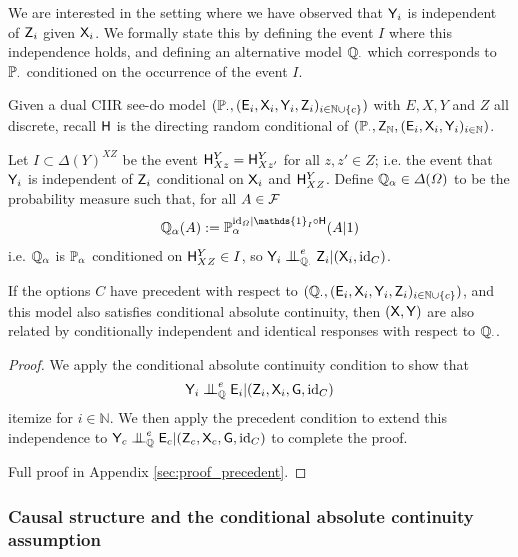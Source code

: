 We are interested in the setting where we have observed that $\mathsf{Y}_i$ is independent of $\mathsf{Z}_i$ given $\mathsf{X}_i$. We formally state this by defining the event $I$ where this independence holds, and defining an alternative model $\mathbb{Q}_{\cdot}$ which corresponds to $\mathbb{P}_\cdot$ conditioned on the occurrence of the event $I$.

\begin{theorem}\label{th:latent_to_observable}
Given a dual CIIR see-do model $(\mathbb{P}_\cdot,(\mathsf{E}_i,\mathsf{X}_i,\mathsf{Y}_i,\mathsf{Z}_i)_{i\in\mathbb{N}\cup\{c\}})$ with $E,X,Y$ and $Z$ all discrete, recall $\mathsf{H}$ is the directing random conditional of $(\mathbb{P}_\cdot,\mathsf{Z}_{\mathbb{N}},(\mathsf{E}_i,\mathsf{X}_i,\mathsf{Y}_i)_{i\in \mathbb{N}})$.

Let $I\subset \Delta(Y)^{XZ}$ be the event $\mathsf{H}^Y_{Xz}=\mathsf{H}^Y_{Xz'}$ for all $z,z'\in Z$; i.e. the event that $\mathsf{Y}_i$ is independent of $\mathsf{Z}_i$ conditional on $\mathsf{X}_i$ and $\mathsf{H}^Y_{XZ}$. Define $\mathbb{Q}_\alpha\in \Delta(\Omega)$ to be the probability measure such that, for all $A\in \mathcal{F}$
\begin{align}
\prob{Q}_\alpha(A) := \prob{P}_\alpha^{\mathrm{id}_\Omega|\mathds{1}_I\circ \RV{H}}(A|1)
\end{align}
i.e. $\mathbb{Q}_\alpha$ is $\mathbb{P}_\alpha$ conditioned on $\mathsf{H}^Y_{XZ}\in I$, so $\RV{Y}_i\CI^e_{\prob{Q}_\cdot} \RV{Z}_i|(\RV{X}_i,\mathrm{id}_C)$.

If the options $C$ have precedent with respect to $(\mathbb{Q}_\cdot,(\mathsf{E}_i,\mathsf{X}_i,\mathsf{Y}_i,\mathsf{Z}_i)_{i\in\mathbb{N}\cup\{c\}})$, and this model also satisfies conditional absolute continuity, then $(\mathsf{X},\mathsf{Y})$ are also related by conditionally independent and identical responses with respect to $\mathbb{Q}_\cdot$.
\end{theorem}

\begin{proof}
We apply the conditional absolute continuity condition to show that $$\RV{Y}_i\CI^e_{\prob{Q}} \RV{E}_i|(\RV{Z}_i,\RV{X}_i,\RV{G},\text{id}_C)$$itemize for $i\in \mathbb{N}$. We then apply the precedent condition to extend this independence to $\RV{Y}_c\CI^e_{\prob{Q}} \RV{E}_c|(\RV{Z}_c,\RV{X}_c,\RV{G},\text{id}_C)$ to complete the proof.

Full proof in Appendix \ref{sec:proof_precedent}.
\end{proof}

\subsubsection[Continuity and structure]{Causal structure and the conditional absolute continuity assumption}

